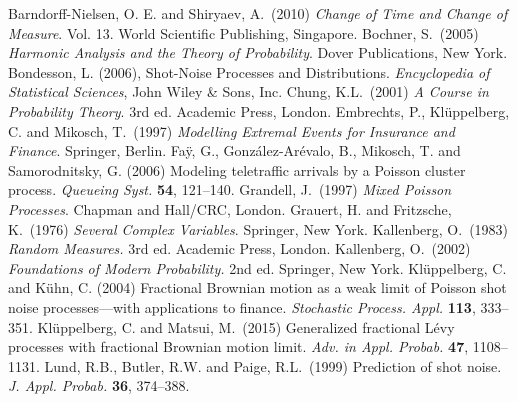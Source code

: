 \documentclass[11pt,leqno%
]{amsart}
\newcommand{\1}{{\mathbf 1}}
\begin{document}
\begin{thebibliography}{99}
\baselineskip12pt
{\sc Barndorff-Nielsen, O. E. and Shiryaev, A.}\ (2010)
{\em Change of Time and Change of Measure}. Vol. 13. World Scientific
	Publishing, Singapore. 
{\sc Bochner, S.}\ (2005)
{\em Harmonic Analysis and the Theory of Probability}. Dover
	Publications, New York. 
{\sc Bondesson, L.} (2006),
Shot-Noise Processes and Distributions.  
{\em Encyclopedia of Statistical Sciences}, John Wiley \& Sons, Inc.
{\sc Chung, K.L.}\ (2001)
{\em A Course in Probability Theory}. 3rd ed. Academic Press, London. 
{\sc Embrechts, P., Kl\"uppelberg, C. and Mikosch, T.}\ (1997)
{\em Modelling Extremal Events for Insurance and Finance}.
Springer, Berlin.
{\sc Fa\"y, G., Gonz\'alez-Ar\'evalo, B., Mikosch, T. and 
 Samorodnitsky, G.} (2006)
Modeling teletraffic arrivals by a Poisson cluster process. 
{\em Queueing Syst.} {\bf 54}, 121--140. 
{\sc Grandell, J.}\ (1997)
{\em Mixed Poisson Processes}. Chapman and Hall/CRC,
	London.
{\sc Grauert, H. and Fritzsche, K.}\ (1976)
{\em Several Complex Variables}. Springer, New York.
{\sc Kallenberg, O.}\ (1983)
{\em Random Measures.} 3rd ed. Academic Press, London.
{\sc Kallenberg, O.}\ (2002)
{\em Foundations of Modern Probability.} 2nd ed. Springer, New York.
{\sc Kl\"uppelberg, C. and  K\"uhn, C.} (2004) 
Fractional Brownian motion as a weak limit of Poisson shot noise 
processes---with applications to finance.  {\em Stochastic
  Process. Appl.}  {\bf 113}, 333--351. 
{\sc Kl\"uppelberg, C. and Matsui, M.}\ (2015)
Generalized fractional L\'evy processes with fractional Brownian motion
	limit. {\em Adv. in Appl. Probab.} {\bf 47}, 1108--1131.
{\sc Lund, R.B., Butler, R.W. and Paige, R.L.}\ (1999)  
Prediction of shot noise. {\em J. Appl. Probab.} {\bf 36}, 374--388.

\end{thebibliography}
\end{document}

